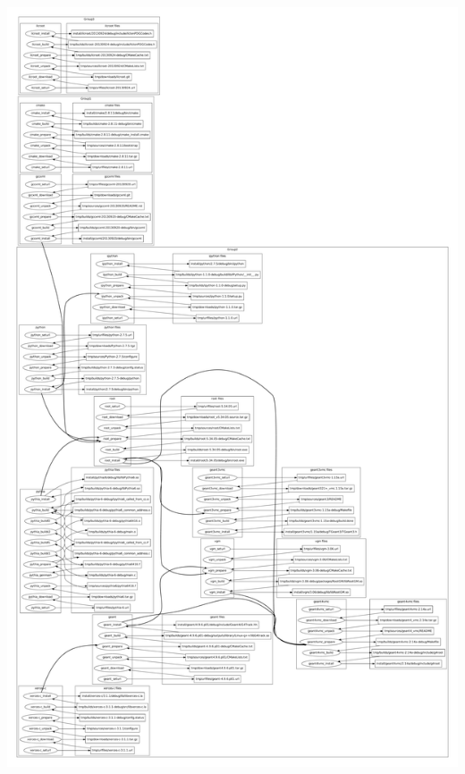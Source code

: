 \documentclass[xcolor=dvipsnames]{beamer}
\begin{document}
\begin{frame}[fragile]
\begin{columns}
\begin{column}{0.5\textwidth}
      \includegraphics[height=\textheight]{orka}      
    \end{column}
  \end{columns}
\end{frame}
\end{document}
